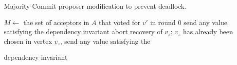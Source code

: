 \begin{algorithm}[ht]
  \caption{Majority Commit \BPaxos{} proposer modification to prevent deadlock.}%
  \begin{algorithmic}[1]
    \makeatletter
    \setcounter{ALG@line}{10}
    \makeatother
    \State $M \gets$ the set of acceptors in $A$ that voted for $v'$ in round $0$
      \State send any value satisfying the dependency invariant
    \EndIf{}
        \State abort recovery of $v_z$; $v_z$ has already been chosen
      \Else{}
        \State in vertex $v_z$, send any value satisfying the

               \hspace{0.15in}dependency invariant
      \EndIf{}
    \EndIf{}
  \end{algorithmic}
\end{algorithm}
